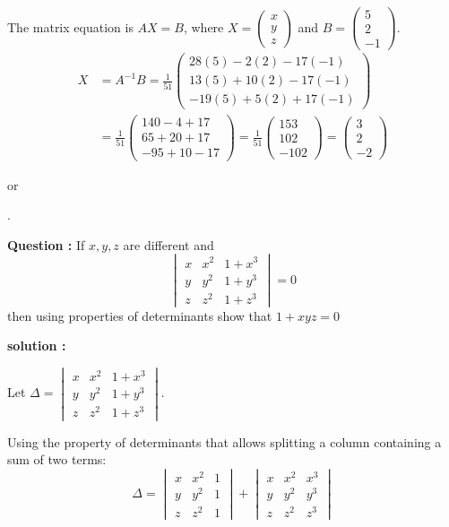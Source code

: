 \begin{enumerate}[label=\thesubsection.\arabic*, ref=\thesubsection.\theenumi]
The matrix equation is $AX = B$, where $X = \begin{pmatrix} x \\ y \\ z \end{pmatrix}$ and $B = \begin{pmatrix} 5 \\ 2 \\ -1 \end{pmatrix}$.
\begin{align*}
X &= A^{-1}B = \frac{1}{51} \begin{pmatrix} 28(5) - 2(2) - 17(-1) \\ 13(5) + 10(2) - 17(-1) \\ -19(5) + 5(2) + 17(-1) \end{pmatrix} \\
&= \frac{1}{51} \begin{pmatrix} 140 - 4 + 17 \\ 65 + 20 + 17 \\ -95 + 10 - 17 \end{pmatrix} = \frac{1}{51} \begin{pmatrix} 153 \\ 102 \\ -102 \end{pmatrix} = \begin{pmatrix} 3 \\ 2 \\ -2 \end{pmatrix}
\end{align*}

\begin{center}
    or 
\end{center}.


\textbf{Question :} If $x, y, z$ are different and 
$$\begin{vmatrix} x & x^2 & 1+x^3 \\ y & y^2 & 1+y^3 \\ z & z^2 & 1+z^3 \end{vmatrix} = 0$$
then using properties of determinants show that $1+xyz=0$

\textbf{solution :}

Let $\Delta = \begin{vmatrix} x & x^2 & 1+x^3 \\ y & y^2 & 1+y^3 \\ z & z^2 & 1+z^3 \end{vmatrix}$.

Using the property of determinants that allows splitting a column containing a sum of two terms:
$$\Delta = \begin{vmatrix} x & x^2 & 1 \\ y & y^2 & 1 \\ z & z^2 & 1 \end{vmatrix} + \begin{vmatrix} x & x^2 & x^3 \\ y & y^2 & y^3 \\ z & z^2 & z^3 \end{vmatrix}$$


\end{enumerate}
